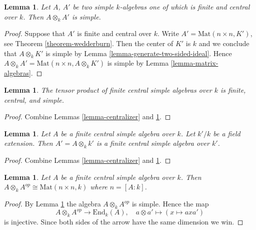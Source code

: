 \documentclass{stacks-project}
\theoremstyle{plain}
\newtheorem{lemma}[subsection]{Lemma}
\theoremstyle{definition}
\theoremstyle{remark}
\numberwithin{equation}{subsection}
\begin{document}
\begin{lemma}
\label{lemma-tensor-simple}
Let $A$, $A'$ be two simple $k$-algebras one of which is finite and central
over $k$. Then $A \otimes_k A'$ is simple.
\end{lemma}

\begin{proof}
Suppose that $A'$ is finite and central over $k$.
Write $A' = \text{Mat}(n \times n, K')$, see
Theorem \ref{theorem-wedderburn}.
Then the center of $K'$ is $k$ and we conclude that
$A \otimes_k K'$ is simple by
Lemma \ref{lemma-generate-two-sided-ideal}.
Hence $A \otimes_k A' = \text{Mat}(n \times n, A \otimes_k K')$ is simple
by Lemma \ref{lemma-matrix-algebras}.
\end{proof}

\begin{lemma}
\label{lemma-tensor-central-simple}
The tensor product of finite central simple algebras over $k$ is finite,
central, and simple.
\end{lemma}

\begin{proof}
Combine Lemmas \ref{lemma-centralizer} and \ref{lemma-tensor-simple}.
\end{proof}

\begin{lemma}
\label{lemma-base-change}
Let $A$ be a finite central simple algebra over $k$.
Let $k'/k$ be a field extension. Then $A' = A \otimes_k k'$ is
a finite central simple algebra over $k'$.
\end{lemma}

\begin{proof}
Combine Lemmas \ref{lemma-centralizer} and \ref{lemma-tensor-simple}.
\end{proof}

\begin{lemma}
\label{lemma-inverse}
Let $A$ be a finite central simple algebra over $k$.
Then $A \otimes_k A^{op} \cong \text{Mat}(n \times n, k)$
where $n = [A : k]$.
\end{lemma}

\begin{proof}
By Lemma \ref{lemma-tensor-central-simple} the algebra $A \otimes_k A^{op}$
is simple. Hence the map
$$
A \otimes_k A^{op} \longrightarrow \text{End}_k(A),\quad
a \otimes a' \longmapsto (x \mapsto axa')
$$
is injective. Since both sides of the arrow have the same dimension
we win.
\end{proof}
\end{document}
